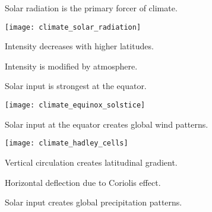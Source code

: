 \begin{frame}[t,plain]{Solar radiation is the primary forcer of climate.}
	\begin{minipage}{0.6\textwidth}%
		\texttt{[image: climate\_solar\_radiation]}
	\end{minipage}
	\begin{minipage}{0.35\textwidth}%
		\vspace{-4\baselineskip}
		\hangpara Intensity decreases with higher latitudes.
		
		\hangpara Intensity is modified by atmosphere.

	\end{minipage}
\end{frame}


\begin{frame}[t,plain]{Solar input is strongest at the equator.}
	
	\begin{center}
		\texttt{[image: climate\_equinox\_solstice]}
	\end{center}
		
\end{frame}

\begin{frame}[t,plain]{Solar input at the equator creates global wind patterns.}
	\begin{minipage}{0.55\textwidth}%
		\texttt{[image: climate\_hadley\_cells]}
	\end{minipage}
	\begin{minipage}{0.40\textwidth}%
		\vspace{-4\baselineskip}
		\hangpara Vertical circulation creates latitudinal gradient.
		
		\hangpara Horizontal deflection due to Coriolis effect.

	\end{minipage}
\end{frame}

{
\begin{frame}[t,plain]{Solar input creates global precipitation patterns.}
\end{frame}
}

{
\begin{frame}[t,plain]
\end{frame}
}

